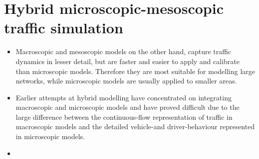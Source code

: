 \documentclass[]{article}
\begin{document}
	\section{Hybrid microscopic-mesoscopic traffic simulation}
	\begin{itemize}
		\item Macroscopic and mesoscopic models on the other hand, capture traffic dynamics in lesser detail, but are faster and easier to apply and calibrate than microscopic models. Therefore they are most suitable for modelling large networks, while microscopic models are usually applied to smaller areas.
		\item Earlier attempts at hybrid modelling have concentrated on integrating macroscopic and microscopic models and have proved difficult due to the large difference between the continuous-flow representation of traffic in macroscopic models and the detailed vehicle-and driver-behaviour represented in microscopic models.
		\item 
	\end{itemize}
	


\end{document}
